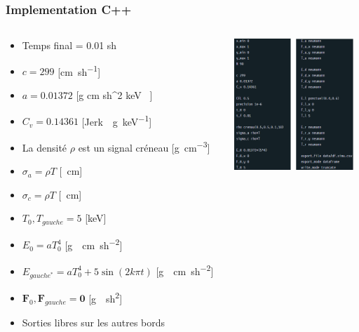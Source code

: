 \documentclass[xcolor=dvipsnames]{beamer} %
\newcommand{\bvec}[1]{\mathbf{#1}}
\begin{document}
\begin{frame}
  \frametitle{Implementation C++}
  \begin{columns}
    \begin{column}{0.6\textwidth}
      \scriptsize
      \begin{itemize}
        \item Temps final = 0.01 \si{sh} %
        \item $c = 299$ [\si{\cm \per sh}]
        \item $a = 0.01372$ [\si{g \per cm \per sh^2  \per keV }]
        \item $C_v = 0.14361$ [\si{Jerk \per\g \per keV}] %
        \item La densité $\rho$ est un signal créneau [\si{\g\per\cm\cubed}]
        \item $\sigma_a = \rho T$ [\si{\per\cm}]
        \item $\sigma_c = \rho T$ [\si{\per\cm}]
        \item $T_0, T_{gauche} = 5$ [\si{keV}] %
        \item $E_0 = aT_0^4$ [\si{g \per \cm \per sh^2}]
        \item $E_{gauche^*} = aT_{0}^4 + 5 \sin (2 k \pi t)$ [\si{g \per \cm \per sh^2}]
        \item $\bvec{F}_0, \bvec{F}_{gauche} = \bvec{0}$ [\si{g \per sh^2}]
        \item Sorties libres sur les autres bords
      \end{itemize}
    \end{column}
    \begin{column}{0.4\textwidth}
        \includegraphics[width=4.5cm]{SimuCFG}   %
    \end{column}
   \end{columns}
\end{frame}
\end{document}
